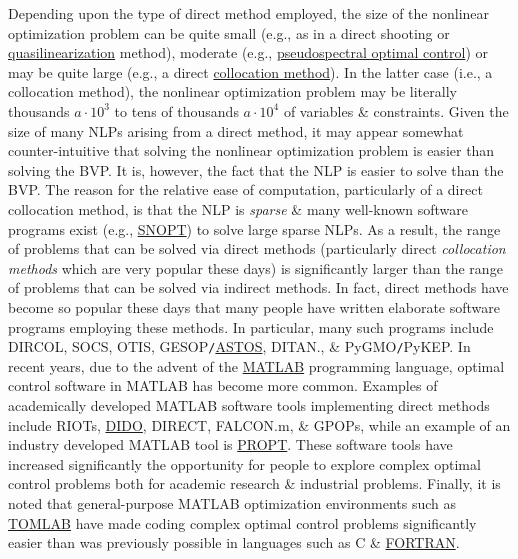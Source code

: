 \documentclass{article}
\begin{document}
Depending upon the type of direct method employed, the size of the nonlinear optimization problem can be quite small (e.g., as in a direct shooting or \href{https://en.wikipedia.org/wiki/Quasilinearization}{quasilinearization} method), moderate (e.g., \href{https://en.wikipedia.org/wiki/Pseudospectral_optimal_control}{pseudospectral optimal control}) or may be quite large (e.g., a direct \href{https://en.wikipedia.org/wiki/Collocation_method}{collocation method}). In the latter case (i.e., a collocation method), the nonlinear optimization problem may be literally thousands $a\cdot10^3$ to tens of thousands $a\cdot10^4$ of variables \& constraints. Given the size of many NLPs arising from a direct method, it may appear somewhat counter-intuitive that solving the nonlinear optimization problem is easier than solving the BVP. It is, however, the fact that the NLP is easier to solve than the BVP. The reason for the relative ease of computation, particularly of a direct collocation method, is that the NLP is {\it sparse} \& many well-known software programs exist (e.g., \href{https://en.wikipedia.org/wiki/SNOPT}{SNOPT}) to solve large sparse NLPs. As a result, the range of problems that can be solved via direct methods (particularly direct {\it collocation methods} which are very popular these days) is significantly larger than the range of problems that can be solved via indirect methods. In fact, direct methods have become so popular these days that many people have written elaborate software programs employing these methods. In particular, many such programs include DIRCOL, SOCS, OTIS, GESOP{\tt/}\href{https://en.wikipedia.org/wiki/ASTOS}{ASTOS}, DITAN., \& PyGMO{\tt/}PyKEP. In recent years, due to the advent of the \href{https://en.wikipedia.org/wiki/MATLAB}{MATLAB} programming language, optimal control software in MATLAB has become more common. Examples of academically developed MATLAB software tools implementing direct methods include RIOTs, \href{https://en.wikipedia.org/wiki/DIDO_(optimal_control)}{DIDO}, DIRECT, FALCON.m, \& GPOPs, while an example of an industry developed MATLAB tool is \href{https://en.wikipedia.org/wiki/PROPT}{PROPT}. These software tools have increased significantly the opportunity for people to explore complex optimal control problems both for academic research \& industrial problems. Finally, it is noted that general-purpose MATLAB optimization environments such as \href{https://en.wikipedia.org/wiki/TOMLAB}{TOMLAB} have made coding complex optimal control problems significantly easier than was previously possible in languages such as C \& \href{https://en.wikipedia.org/wiki/FORTRAN}{FORTRAN}.
\end{document}

